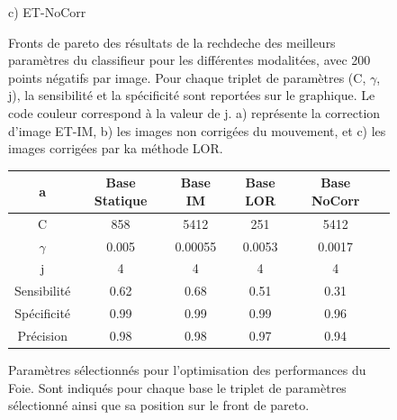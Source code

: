 \begin{figure}[h!]
\begin{center}
{\small c) ET-NoCorr}

\end{center}
 \caption{\label{fig:paretoModalite} Fronts de pareto des résultats de la rechdeche des meilleurs paramètres du classifieur pour les différentes modalitées, avec 200 points négatifs par image. Pour chaque triplet de paramètres (C, $\gamma$, j), la sensibilité et la spécificité sont reportées sur le graphique. Le code couleur correspond à la valeur de j. a) représente la correction d'image ET-IM, b) les images non corrigées du mouvement, et c) les images corrigées par ka méthode LOR.}
\end{figure}




\begin{figure}[h!]
\label{fig:paramsModFoie}
		\begin{tabular}{c c c c c c}
  \hline
  a	& Base Statique	& Base IM	& Base LOR	& Base NoCorr	\\
  \hline
 C 	& 858		& 5412		& 251		& 5412		\\
\hline
$\gamma$& 0.005		& 0.00055	& 0.0053	& 0.0017	\\
\hline
j	& 4		& 4		& 4		& 4		\\
\hline
\hline
Sensibilité& 0.62	& 0.68		& 0.51		& 0.31	\\
\hline
Spécificité& 0.99	& 0.99		& 0.99		& 0.96		\\
\hline
Précision& 0.98		& 0.98		& 0.97		& 0.94		\\
\hline
 		\end{tabular}

\caption{Paramètres sélectionnés pour l'optimisation des performances du Foie. Sont indiqués pour chaque base le triplet de paramètres sélectionné ainsi que sa position sur le front de pareto.}
\end{figure}




